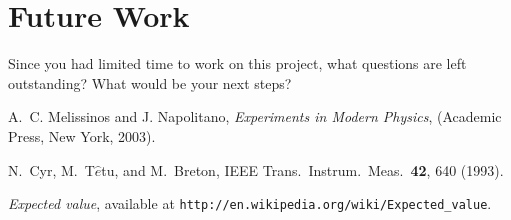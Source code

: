 \documentclass[letterpaper,12pt]{article}
\begin{document}
\blindtext

\section{Future Work}
Since you had limited time to work on this project, what questions are left outstanding? What would be your next steps? 




\begin{thebibliography}{99}

A.~C. Melissinos and J. Napolitano, \textit{Experiments in Modern Physics},
(Academic Press, New York, 2003).

N.\ Cyr, M.\ T$\hat{e}$tu, and M.\ Breton,
IEEE Trans.\ Instrum.\ Meas.\ \textbf{42}, 640 (1993).

 \emph{Expected value},  available at
\texttt{http://en.wikipedia.org/wiki/Expected\_value}.

\end{thebibliography}
\end{document}
